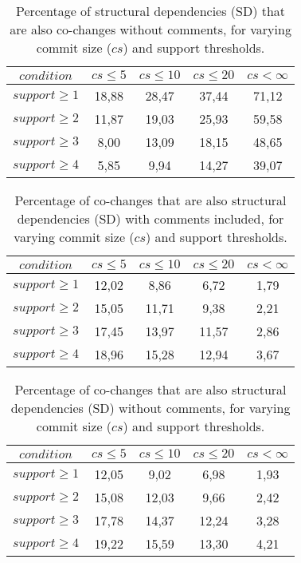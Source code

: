 \begin{table}[!h]
\renewcommand{\arraystretch}{1}
\caption{Percentage of structural dependencies (SD) that are also co-changes without comments, for varying commit size ($cs$) and support thresholds.}
\label{tab:percSD:nocomm}
\centering
\begin{tabular}{|c|c|c|c|c|}
\hline
$condition$	      &	$cs\leq 5$	&	$cs\leq 10$	&	$cs\leq 20$	&	$cs< \infty$	\\
\hline
$support\geq 1$	&	18,88	&	28,47	&	37,44	&	71,12	\\
$support\geq 2$	&	11,87	&	19,03	&	25,93	&	59,58	\\
$support\geq 3$	&	8,00	&	13,09	&	18,15	&	48,65	\\
$support\geq 4$	&	5,85	&	9,94	&	14,27	&	39,07	\\
\hline
\end{tabular}
\end{table}

\begin{table}[!h]
\renewcommand{\arraystretch}{1}
\caption{Percentage of co-changes that are also structural dependencies (SD) with comments included, for varying commit size ($cs$) and support thresholds.}
\label{tab:percLD:comm}
\centering
\begin{tabular}{|c|c|c|c|c|}
\hline
$condition$	      &	$cs\leq 5$	&	$cs\leq 10$	&	$cs\leq 20$	&	$cs< \infty$	\\
\hline
$support\geq 1$	&	12,02	&	8,86	&	6,72	&	1,79	\\
$support\geq 2$	&	15,05	&	11,71	&	9,38	&	2,21	\\
$support\geq 3$	&	17,45	&	13,97	&	11,57	&	2,86	\\
$support\geq 4$	&	18,96	&	15,28	&	12,94	&	3,67	\\
\hline
\end{tabular}
\end{table}

\begin{table}[!h]
\renewcommand{\arraystretch}{1}
\caption{Percentage of co-changes that are also structural dependencies (SD) without comments, for varying commit size ($cs$) and support thresholds.}
\label{tab:percLD:nocomm}
\centering
\begin{tabular}{|c|c|c|c|c|}
\hline
$condition$      &	$cs\leq 5$	&	$cs\leq 10$	&	$cs\leq 20$	&	$cs< \infty$	\\
\hline
$support\geq 1$	&	12,05	&	9,02	&	6,98	&	1,93	\\
$support\geq 2$	&	15,08	&	12,03	&	9,66	&	2,42	\\
$support\geq 3$	&	17,78	&	14,37	&	12,24	&	3,28	\\
$support\geq 4$	&	19,22	&	15,59	&	13,30	&	4,21	\\
\hline
\end{tabular}
\end{table}

